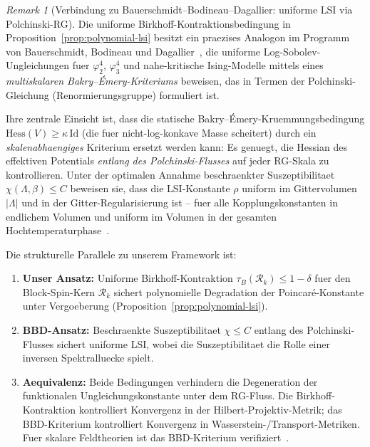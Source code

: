 \documentclass[12pt,a4paper]{article}
\theoremstyle{definition}
\theoremstyle{plain}
\theoremstyle{remark}
\newtheorem{remark}[definition]{Remark}
\begin{document}
\begin{remark}[Verbindung zu Bauerschmidt--Bodineau--Dagallier: uniforme LSI via Polchinski-RG]
\label{rem:bbd-polchinski}
Die uniforme Birkhoff-Kontraktionsbedingung in Proposition~\ref{prop:polynomial-lsi} besitzt ein praezises Analogon im Programm von Bauerschmidt, Bodineau und Dagallier~\cite{BBD-Survey2024,BBD-Ising2024,BBD-Phi4-2024}, die uniforme Log-Sobolev-Ungleichungen fuer $\varphi^4_2$, $\varphi^4_3$ und nahe-kritische Ising-Modelle mittels eines \emph{multiskalaren Bakry--\'Emery-Kriteriums} beweisen, das in Termen der Polchinski-Gleichung (Renormierungsgruppe) formuliert ist.

Ihre zentrale Einsicht ist, dass die statische Bakry--\'Emery-Kruemmungsbedingung $\mathrm{Hess}(V) \geq \kappa\,\mathrm{Id}$ (die fuer nicht-log-konkave Masse scheitert) durch ein \emph{skalenabhaengiges} Kriterium ersetzt werden kann: Es genuegt, die Hessian des effektiven Potentials \emph{entlang des Polchinski-Flusses} auf jeder RG-Skala zu kontrollieren. Unter der optimalen Annahme beschraenkter Suszeptibilitaet $\chi(\Lambda, \beta) \leq C$ beweisen sie, dass die LSI-Konstante $\rho$ uniform im Gittervolumen $|\Lambda|$ und in der Gitter-Regularisierung ist -- fuer alle Kopplungskonstanten in endlichem Volumen und uniform im Volumen in der gesamten Hochtemperaturphase~\cite{BBD-Phi4-2024}.

Die strukturelle Parallele zu unserem Framework ist:
\begin{enumerate}
    \item \textbf{Unser Ansatz:} Uniforme Birkhoff-Kontraktion $\tau_B(\mathcal{R}_k) \leq 1 - \delta$ fuer den Block-Spin-Kern $\mathcal{R}_k$ sichert polynomielle Degradation der Poincar\'e-Konstante unter Vergoeberung (Proposition~\ref{prop:polynomial-lsi}).
    \item \textbf{BBD-Ansatz:} Beschraenkte Suszeptibilitaet $\chi \leq C$ entlang des Polchinski-Flusses sichert uniforme LSI, wobei die Suszeptibilitaet die Rolle einer inversen Spektralluecke spielt.
    \item \textbf{Aequivalenz:} Beide Bedingungen verhindern die Degeneration der funktionalen Ungleichungskonstante unter dem RG-Fluss. Die Birkhoff-Kontraktion kontrolliert Konvergenz in der Hilbert-Projektiv-Metrik; das BBD-Kriterium kontrolliert Konvergenz in Wasserstein-/Transport-Metriken. Fuer skalare Feldtheorien ist das BBD-Kriterium verifiziert~\cite{BBD-Phi4-2024}.
\end{enumerate}


\end{remark}
\end{document}

